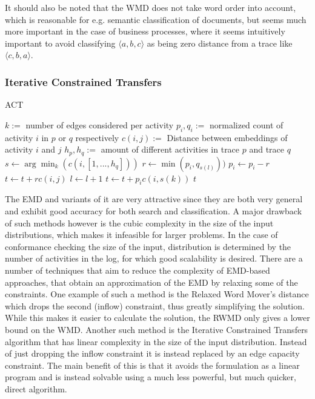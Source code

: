 \documentclass[runningheads]{template/llncs}
\begin{document}
It should also be noted that the WMD does not take word order into account, which is reasonable for e.g. semantic classification of documents, but seems much more important in the case of business processes, where it seems intuitively important to avoid classifying $\langle a,b,c\rangle$ as being zero distance from a trace like $\langle c,b,a \rangle$.

\subsubsection{Iterative Constrained Transfers}
\begin{algorithm}
	\caption{ACT}\label{alg:act}
	\begin{algorithmic}
		\State $k:=$ number of edges considered per activity
		\State $p_i,q_i := $ normalized count of activity $i$ in $p$ or $q$ respectively
		\State $c(i,j) :=$ Distance between embeddings of activity $i$ and $j$
		\State $h_p,h_q :=$ amount of different activities in trace $p$ and trace $q$ 
		\State $s \gets \arg \min_k(c(i,[1,...,h_q]))$ 
		\State $r \gets \min(p_i,q_{s(l)}))$ 
		\State $p_i \gets p_i - r$ 
		\State $t \gets t + rc(i,j)$ 
		\State $l \gets l+1$
		\EndWhile
		 
		\State $t \gets t + p_ic(i,s(k))$ 
		\EndIf
		\EndFor
		\State \Return $t$
		\EndFunction
	\end{algorithmic}
\end{algorithm}
The EMD and variants of it are very attractive since they are both very general and exhibit good accuracy for both search and classification.
A major drawback of such methods however is the cubic complexity in the size of the input distributions, which makes it infeasible for larger problems.
In the case of conformance checking the size of the input, distribution is determined by the number of activities in the log, for which good scalability is desired.
There are a number of techniques that aim to reduce the complexity of EMD-based approaches, that obtain an approximation of the EMD by relaxing some of the constraints.  
One example of such a method is the Relaxed Word Mover's distance which drops the second (inflow) constraint, thus greatly simplifying the solution.
While this makes it easier to calculate the solution, the RWMD only gives a lower bound on the WMD.
Another such method is the Iterative Constrained Transfers \cite{AtMi18} algorithm that has linear complexity in the size of the input distribution.
Instead of just dropping the inflow constraint it is instead replaced by an edge capacity constraint.
The main benefit of this is that it avoids the formulation as a linear program and is instead solvable using a much less powerful, but much quicker, direct algorithm.
\end{document}

